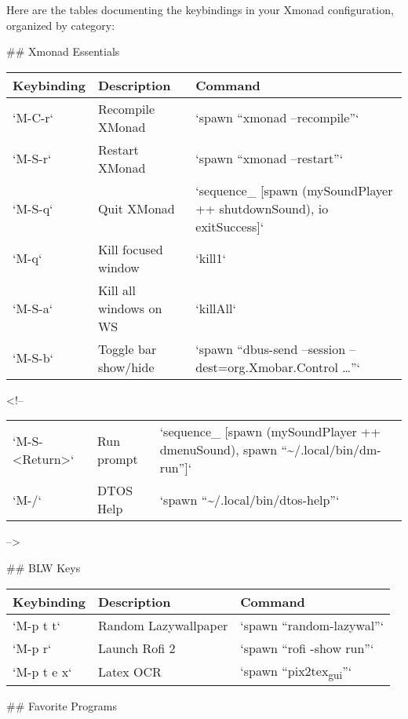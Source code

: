 \documentclass[11pt]{article}
\author{Pedro Branquinho}
\date{\today}
\title{}
\begin{document}
\tableofcontents

Here are the tables documenting the keybindings in your Xmonad configuration, organized by category:

\#\# Xmonad Essentials

\begin{center}
\begin{tabular}{lll}
Keybinding & Description & Command\\
\hline
`M-C-r` & Recompile XMonad & `spawn ``xmonad --recompile''`\\
`M-S-r` & Restart XMonad & `spawn ``xmonad --restart''`\\
`M-S-q` & Quit XMonad & `sequence\_ [spawn (mySoundPlayer ++ shutdownSound), io exitSuccess]`\\
`M-q` & Kill focused window & `kill1`\\
`M-S-a` & Kill all windows on WS & `killAll`\\
`M-S-b` & Toggle bar show/hide & `spawn ``dbus-send --session --dest=org.Xmobar.Control \ldots{}''`\\
\end{tabular}
\end{center}

<!-- 
\begin{center}
\begin{tabular}{lll}
`M-S-<Return>` & Run prompt & `sequence\_ [spawn (mySoundPlayer ++ dmenuSound), spawn ``\textasciitilde{}/.local/bin/dm-run'']`\\
`M-/` & DTOS Help & `spawn ``\textasciitilde{}/.local/bin/dtos-help''`\\
\end{tabular}
\end{center}
-->

\#\# BLW Keys

\begin{center}
\begin{tabular}{lll}
Keybinding & Description & Command\\
\hline
`M-p t t` & Random Lazywallpaper & `spawn ``random-lazywal''`\\
`M-p r` & Launch Rofi 2 & `spawn ``rofi -show run''`\\
`M-p t e x` & Latex OCR & `spawn ``pix2tex\textsubscript{gui}''`\\
\end{tabular}
\end{center}

\#\# Favorite Programs
\end{document}
